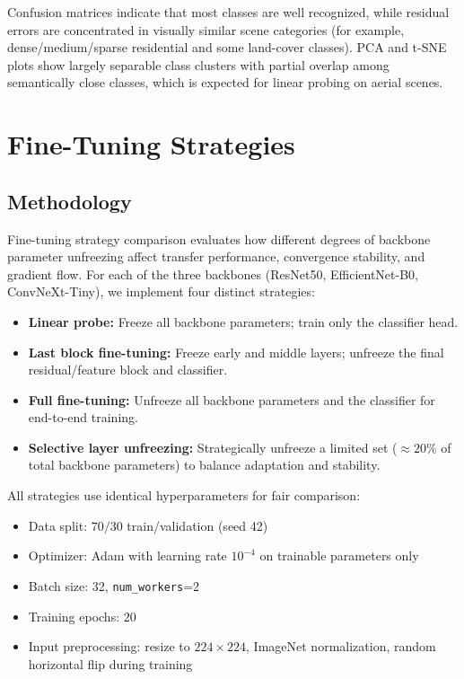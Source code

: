 \documentclass[11pt,a4paper]{article}
\begin{document}
Confusion matrices indicate that most classes are well recognized, while residual errors are concentrated in visually similar scene categories (for example, dense/medium/sparse residential and some land-cover classes). PCA and t-SNE plots show largely separable class clusters with partial overlap among semantically close classes, which is expected for linear probing on aerial scenes.

\section{Fine-Tuning Strategies}

\subsection{Methodology}
Fine-tuning strategy comparison evaluates how different degrees of backbone parameter unfreezing affect transfer performance, convergence stability, and gradient flow. For each of the three backbones (ResNet50, EfficientNet-B0, ConvNeXt-Tiny), we implement four distinct strategies:

\begin{itemize}
	\item \textbf{Linear probe:} Freeze all backbone parameters; train only the classifier head.
	\item \textbf{Last block fine-tuning:} Freeze early and middle layers; unfreeze the final residual/feature block and classifier.
	\item \textbf{Full fine-tuning:} Unfreeze all backbone parameters and the classifier for end-to-end training.
	\item \textbf{Selective layer unfreezing:} Strategically unfreeze a limited set ($\approx 20\%$ of total backbone parameters) to balance adaptation and stability.
\end{itemize}

All strategies use identical hyperparameters for fair comparison:
\begin{itemize}
	\item Data split: $70/30$ train/validation (seed 42)
	\item Optimizer: Adam with learning rate $10^{-4}$ on trainable parameters only
	\item Batch size: 32, \texttt{num\_workers}=2
	\item Training epochs: 20
	\item Input preprocessing: resize to $224\times224$, ImageNet normalization, random horizontal flip during training
\end{itemize}
\end{document}
